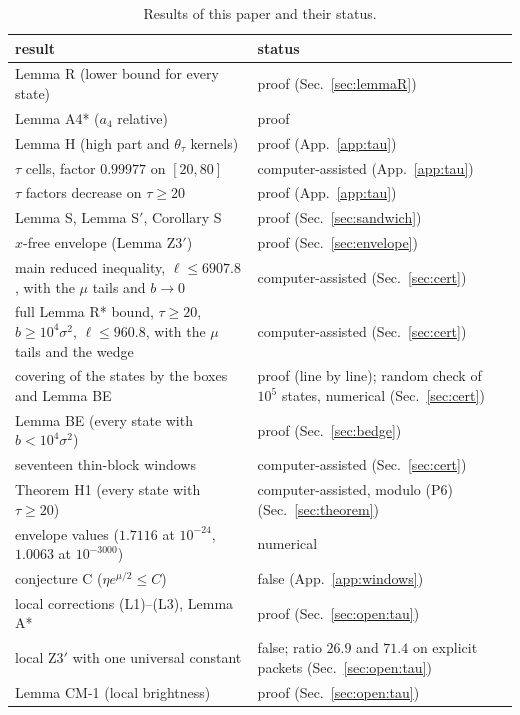 \begin{table}
\caption{Results of this paper and their status.}
\label{tab:status}
\begin{ruledtabular}
\small
\begin{tabular}{p{}p{}}
result & status\\ \hline
Lemma R (lower bound for every state) & proof (Sec.~\ref{sec:lemmaR})\\
Lemma A4* ($a_4$ relative) & proof\\
Lemma H (high part and $\theta_\tau$ kernels) & proof (App.~\ref{app:tau})\\
$\tau$ cells, factor $0.99977$ on $[20,80]$ & computer-assisted (App.~\ref{app:tau})\\
$\tau$ factors decrease on $\tau\ge20$ & proof (App.~\ref{app:tau})\\
Lemma S, Lemma S$'$, Corollary S & proof (Sec.~\ref{sec:sandwich})\\
$x$-free envelope (Lemma Z3$'$) & proof (Sec.~\ref{sec:envelope})\\
main reduced inequality, $\ell\le6907.8$, with the $\mu$ tails and $b\to0$ & computer-assisted (Sec.~\ref{sec:cert})\\
full Lemma R* bound, $\tau\ge20$, $b\ge10^4\sigma^2$, $\ell\le960.8$, with the $\mu$ tails and the wedge & computer-assisted (Sec.~\ref{sec:cert})\\
covering of the states by the boxes and Lemma BE & proof (line by line); random check of $10^5$ states, numerical (Sec.~\ref{sec:cert})\\
Lemma BE (every state with $b<10^4\sigma^2$) & proof (Sec.~\ref{sec:bedge})\\
seventeen thin-block windows & computer-assisted (Sec.~\ref{sec:cert})\\
Theorem H1 (every state with $\tau\ge20$) & computer-assisted, modulo (P6) (Sec.~\ref{sec:theorem})\\
envelope values ($1.7116$ at $10^{-24}$, $1.0063$ at $10^{-3000}$) & numerical\\
conjecture C ($\eta e^{\mu/2}\le C$) & false (App.~\ref{app:windows})\\
local corrections (L1)--(L3), Lemma A* & proof (Sec.~\ref{sec:open:tau})\\
local Z3$'$ with one universal constant & false; ratio $26.9$ and $71.4$ on explicit packets (Sec.~\ref{sec:open:tau})\\
Lemma CM-1 (local brightness) & proof (Sec.~\ref{sec:open:tau})\\

\end{tabular}
\end{ruledtabular}
\end{table}
